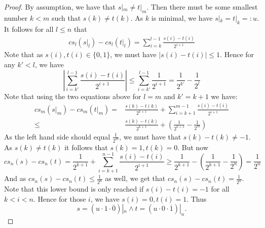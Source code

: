\begin{proof}
  By assumption, we have that $s|_m \neq t|_m$. 
  Then there must be some smallest number $k<m$ such that 
  $s(k) \neq t(k)$. As $k$ is minimal, we have $s|_k = t|_k = : u$. 
  It follows for all $l\leq n$ that 
  \begin{align}
    cs_l(s|_l)-cs_l(t|_l) 
    = \sum\limits_{i = k}^{l-1} \frac{s(i)-t(i)}{2^{i+1}}
  \end{align}
  Note that as $s(i),t(i) \in \{0,1\}$, we must have %
  $|s(i)-t(i)| \leq 1$. 
  Hence for any $k'<l$, we have 
  \begin{equation}
    \left|\sum\limits_{i = k'}^{l-1} \frac{s(i)-t(i)}{2^{i+1}}\right|
    \leq 
    \sum\limits_{i = k'}^{l-1} \frac{1}{2^{i+1}}
    = 
    \frac{1}{2^{k'}} - \frac{1}{2^{l}}
  \end{equation}
  Note that using the two equations above for $l=m$ and $k'=k+1$ we have:
  \begin{align}
    cs_m(s|_m) -cs_m(t|_m) 
    =&
    \frac{s(k)-t(k)}{2^{k+1}} + \sum\limits_{i = k+1}^{m-1} \frac{s(i)-t(i)}{2^{i+1}} \\
    \leq& 
    \frac{s(k)-t(k)}{2^{k+1}} + \left(\frac{1}{2^{k+1}} - \frac{1}{2^{m}}\right)
  \end{align}
  As the left hand side should equal $\frac{1}{2^m}$,
  we must have that $s(k)-t(k) \neq -1$. 
  As $s(k) \neq t(k)$ it follows that $s(k) = 1, t(k) = 0$.
  But now 
  \begin{equation}
    cs_n(s) -cs_n(t) 
    =
    \frac{1}{2^{k+1}} + \sum\limits_{i = k+1}^{n-1} \frac{s(i)-t(i)}{2^{i+1}}
    \geq 
    \frac{1}{2^{k+1}} - \left(\frac{1}{2^{k+1}} - \frac{1}{2^n} \right)
    =
    \frac{1}{2^{n}}
  \end{equation}
  And as $cs_n(s)-cs_n(t) \leq \frac{1}{2^n}$ as well, we get that 
  $cs_n(s)-cs_n(t) = \frac{1}{2^n}$. 
  Note that this lower bound is only reached if $s(i)-t(i) = -1$ for all $k<i<n$. 
  Hence for those $i$, we have $s(i) = 0, t(i) = 1$. 
  Thus 
  \begin{equation}
    s = (u \cdot 1\cdot \overline 0) |_n \wedge 
    t = (u \cdot 0\cdot \overline 1) |_n.
  \end{equation}
\end{proof}


